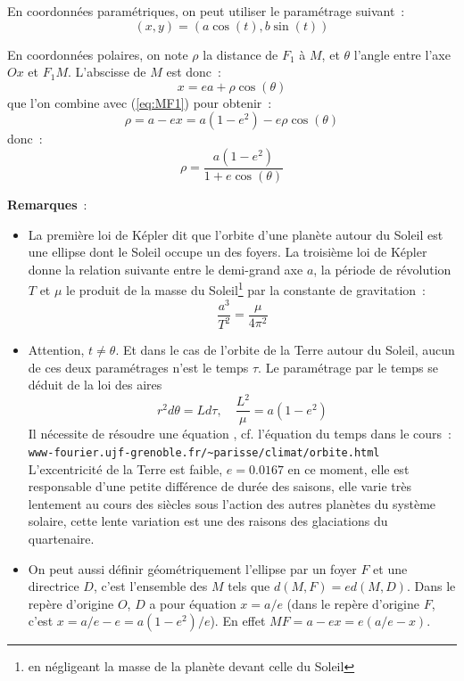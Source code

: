 \documentclass[a4paper,11pt]{article}
\begin{document}
En coordonn\'ees param\'etriques, on peut utiliser le param\'etrage suivant~:
$$ (x,y)=(a\cos(t),b\sin(t))$$

En coordonn\'ees polaires, on note $\rho$ la distance de $F_1$ \`a
$M$, et $\theta$ l'angle entre l'axe $Ox$ et $F_1M$. L'abscisse de $M$
est donc~:
\[ x= ea + \rho \cos(\theta)\]
que l'on combine avec (\ref{eq:MF1}) pour obtenir~:
\[ \rho = a-ex =a(1-e^2) - e \rho \cos(\theta) \]
donc~:
\[ \rho = \frac{a(1-e^2)}{1+e\cos(\theta)} \]

{\bf Remarques}~:
\begin{itemize}
\item La premi\`ere loi de K\'epler dit que l'orbite d'une plan\`ete
autour du Soleil est une ellipse dont le Soleil occupe un des foyers.
La troisi\`eme loi de K\'epler donne la relation suivante entre le
demi-grand axe $a$, la p\'eriode de r\'evolution $T$ et $\mu$
le produit de la masse du Soleil\footnote{en n\'egligeant la masse
de la plan\`ete devant celle du Soleil} par la constante de gravitation~:
$$ \frac{a^3}{T^2} = \frac{\mu}{4\pi^2}$$
\item Attention, $t\neq \theta$. Et dans le cas de l'orbite
de la Terre autour du Soleil, aucun de ces deux param\'etrages n'est
le temps $\tau$. Le param\'etrage par le temps se d\'eduit de la loi
des aires
\[ r^2 d\theta =  L d\tau , \quad
 \frac{L^2}{\mu}= a(1-e^2) \]
Il n\'ecessite de r\'esoudre
une \'equation , cf. l'\'equation du temps dans le cours~:\\
\verb|www-fourier.ujf-grenoble.fr/~parisse/climat/orbite.html|\\
L'excentricit\'e de la Terre est faible, $e=0.0167$ en
ce moment, elle est responsable d'une petite diff\'erence 
de dur\'ee des saisons, elle varie tr\`es lentement au cours des si\`ecles sous
l'action des autres plan\`etes du syst\`eme solaire, cette lente variation
est une des raisons des glaciations du quartenaire.
\item On peut aussi d\'efinir g\'eom\'etriquement l'ellipse
par un foyer $F$ et une directrice $D$, c'est l'ensemble des $M$ tels
que $d(M,F)=ed(M,D)$. Dans le rep\`ere d'origine $O$, $D$
a pour \'equation $x=a/e$ (dans le rep\`ere d'origine $F$, c'est
$x=a/e-e=a(1-e^2)/e$). En effet $MF=a-ex=e(a/e-x)$.
\end{itemize}
\end{document}
